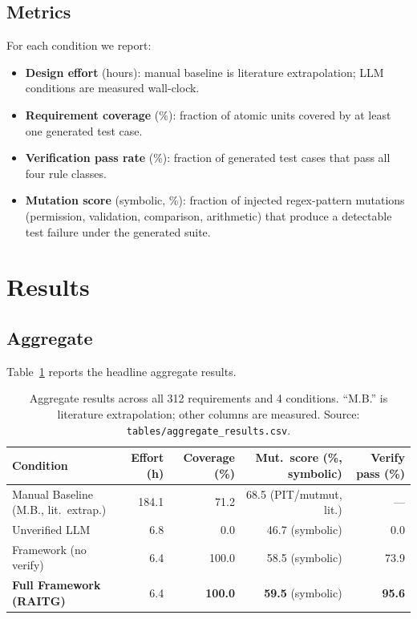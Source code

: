 \documentclass[10pt,twocolumn,letterpaper]{article}
\begin{document}
\subsection{Metrics}

For each condition we report:

\begin{itemize}
  \item \textbf{Design effort} (hours): manual baseline is literature
        extrapolation; LLM conditions are measured wall-clock.
  \item \textbf{Requirement coverage} (\%): fraction of atomic units
        covered by at least one generated test case.
  \item \textbf{Verification pass rate} (\%): fraction of generated
        test cases that pass all four rule classes.
  \item \textbf{Mutation score} (symbolic, \%): fraction of injected
        regex-pattern mutations (permission, validation, comparison,
        arithmetic) that produce a detectable test failure under the
        generated suite.
\end{itemize}

\section{Results}
\label{sec:results}

\subsection{Aggregate}

Table~\ref{tab:agg} reports the headline aggregate results.

\begin{table}[t]
\centering
\caption{Aggregate results across all 312 requirements and 4 conditions.
``M.B.'' is literature extrapolation; other columns are measured.
Source: \texttt{tables/aggregate\_results.csv}.}
\label{tab:agg}
\small
\begin{tabular}{lrrrr}
\toprule
Condition                          & Effort (h) & Coverage (\%) & Mut.\ score (\%, symbolic) & Verify pass (\%) \\
\midrule
Manual Baseline (M.B., lit.\ extrap.) & 184.1   & 71.2          & 68.5 (PIT/mutmut, lit.)     & ---              \\
Unverified LLM                     &   6.8      &  0.0          & 46.7 (symbolic)             & 0.0              \\
Framework (no verify)              &   6.4      & 100.0         & 58.5 (symbolic)             & 73.9             \\
\textbf{Full Framework (RAITG)}    &   6.4      & \textbf{100.0}& \textbf{59.5} (symbolic)    & \textbf{95.6}    \\
\bottomrule
\end{tabular}
\end{table}
\end{document}

